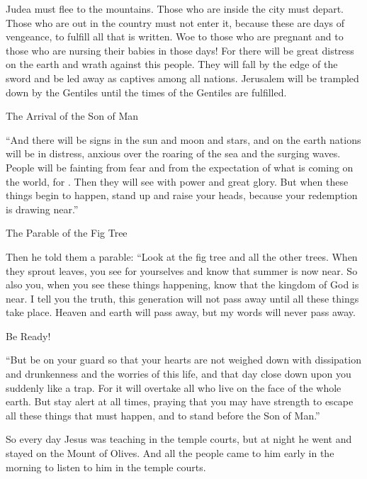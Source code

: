 {Judea
must flee
to
the mountains.
Those who are inside
the city
must depart.
Those who are out in
the country
must
not
enter
it,
because
these
are
days
of vengeance,
to fulfill
all that
is written.
Woe
to those who are pregnant
and
to those who are nursing
their babies
in
those
days! For
there will be
great
distress
on
the earth
and
wrath
against this
people.
They will fall
by
the edge
of
the sword
and
be led away as captives
among
all
nations.
Jerusalem
will be
trampled down
by
the Gentiles
until
the times
of the Gentiles
are fulfilled.
\par }{\SH The Arrival of the Son of Man
\par }{\PP {}“And
there will be
signs
in
the sun
and
moon
and
stars,
and
on
the earth
nations
will be in
distress,
anxious
over the roaring
of
the sea
and
the surging waves.
People
will be fainting
from
fear
and
from the expectation
of what is coming
on the world,
for
{}.
Then
they will see
{}
{}
with
power
and
great
glory.
But
when
these things
begin
to happen,
stand up
and
raise
your
heads,
because
your
redemption
is drawing near.”
\par }{\SH The Parable of the Fig Tree
\par }{\PP {}Then
he told
them
a parable: “Look at
the fig tree
and
all the other
trees.
When
they sprout leaves,
you see
for
yourselves
and know
that
summer
is
now
near.
So
also
you,
when
you see
these things
happening,
know
that
the kingdom
of God
is
near.
I tell
you
the truth,
this
generation
will
not
pass away
until
all these things
take place.
Heaven
and
earth
will pass away,
but
my
words
will
never
pass away.
\par }{\SH Be Ready!
\par }{\PP {}“But
be on
your
guard
so that your
hearts
are
not
weighed down
with
dissipation
and
drunkenness
and
the worries
of this life,
and that
day
close down
upon
you
suddenly like a trap.
For
it will overtake
all
who live
on
the face
of the whole
earth.
But
stay alert
at
all
times,
praying
that you
may
have strength
to escape
all
these things
that must
happen,
and
to stand
before
the Son
of Man.”
\par }{\PP {}So
every day
Jesus was teaching
in
the temple courts,
but
at night
he went
and stayed
on
the Mount
of Olives.
And
all
the people
came
to
him
early in the morning
to listen
to him
in
the temple courts.

}
